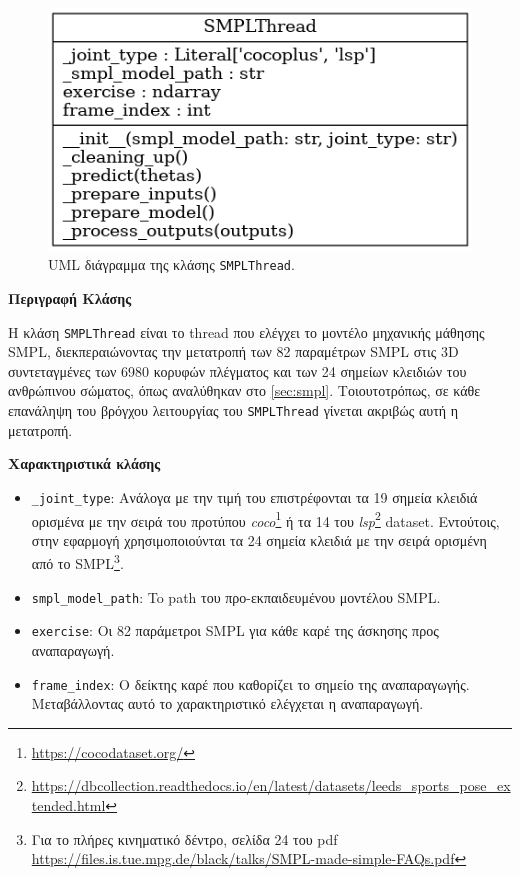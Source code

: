 \begin{figure}[H]
	\centering
	\includegraphics[scale=0.5]{images/chapter5/smpl_thread_uml.png}
	\caption{UML διάγραμμα της κλάσης \texttt{SMPLThread}.}
	\label{fig:smplthread}
\end{figure}

\noindent\textbf{Περιγραφή Κλάσης}

Η κλάση \texttt{SMPLThread} είναι το thread που ελέγχει το μοντέλο μηχανικής μάθησης SMPL, διεκπεραιώνοντας την μετατροπή των 82 παραμέτρων SMPL στις 3D συντεταγμένες των 6980 κορυφών πλέγματος και των 24 σημείων κλειδιών του ανθρώπινου σώματος, όπως αναλύθηκαν στο \ref{sec:smpl}. Τοιουτοτρόπως, σε κάθε επανάληψη του βρόγχου λειτουργίας του \texttt{SMPLThread} γίνεται ακριβώς αυτή η μετατροπή.

\noindent\textbf{Χαρακτηριστικά κλάσης}
\begin{itemize}
	\item \texttt{\_joint\_type}: Ανάλογα με την τιμή του επιστρέφονται τα 19 σημεία κλειδιά ορισμένα με την σειρά του προτύπου \textsl{coco}\footnote{\href{https://cocodataset.org/}{https://cocodataset.org/}} ή τα 14 του \textsl{lsp}\footnote{\href{https://dbcollection.readthedocs.io/en/latest/datasets/leeds\_sports\_pose\_extended.html}{https://dbcollection.readthedocs.io/en/latest/datasets/leeds\_sports\_pose\_extended.html}} dataset. Εντούτοις, στην εφαρμογή χρησιμοποιούνται τα 24 σημεία κλειδιά με την σειρά ορισμένη από το SMPL\footnote{Για το πλήρες κινηματικό δέντρο, σελίδα 24 του pdf \href{https://files.is.tue.mpg.de/black/talks/SMPL-made-simple-FAQs.pdf}{https://files.is.tue.mpg.de/black/talks/SMPL-made-simple-FAQs.pdf}}.
	\item \texttt{smpl\_model\_path}: To path του προ-εκπαιδευμένου μοντέλου SMPL.
	\item \texttt{exercise}: Οι 82 παράμετροι SMPL για κάθε καρέ της άσκησης προς αναπαραγωγή.
	\item \texttt{frame\_index}: Ο δείκτης καρέ που καθορίζει το σημείο της αναπαραγωγής. Μεταβάλλοντας αυτό το χαρακτηριστικό ελέγχεται η αναπαραγωγή.
\end{itemize}

